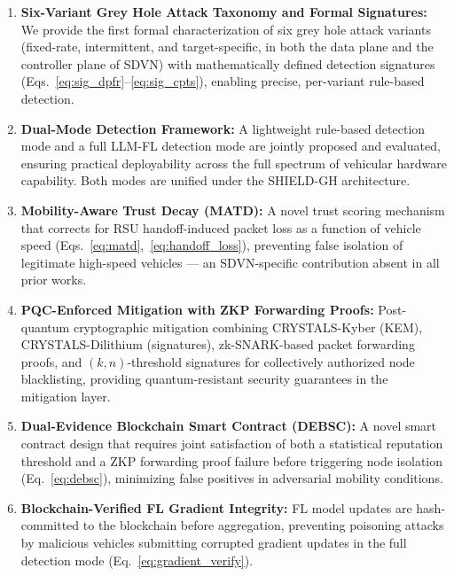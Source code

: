 \documentclass[12pt, a4paper]{report}
\begin{document}
\begin{enumerate}
  \item \textbf{Six-Variant Grey Hole Attack Taxonomy and Formal Signatures:}
  We provide the first formal characterization of six grey hole attack variants
  (fixed-rate, intermittent, and target-specific, in both the data plane and
  the controller plane of SDVN) with mathematically defined detection signatures
  (Eqs.~\eqref{eq:sig_dpfr}--\eqref{eq:sig_cpts}), enabling precise, per-variant
  rule-based detection.

  \item \textbf{Dual-Mode Detection Framework:}
  A lightweight rule-based detection mode and a full LLM-FL detection mode are
  jointly proposed and evaluated, ensuring practical deployability across the
  full spectrum of vehicular hardware capability. Both modes are unified under
  the SHIELD-GH architecture.

  \item \textbf{Mobility-Aware Trust Decay (MATD):}
  A novel trust scoring mechanism that corrects for RSU handoff-induced packet
  loss as a function of vehicle speed (Eqs.~\eqref{eq:matd},~\eqref{eq:handoff_loss}),
  preventing false isolation of legitimate high-speed vehicles — an SDVN-specific
  contribution absent in all prior works.

  \item \textbf{PQC-Enforced Mitigation with ZKP Forwarding Proofs:}
  Post-quantum cryptographic mitigation combining CRYSTALS-Kyber (KEM),
  CRYSTALS-Dilithium (signatures), zk-SNARK-based packet forwarding proofs,
  and $(k,n)$-threshold signatures for collectively authorized node blacklisting,
  providing quantum-resistant security guarantees in the mitigation layer.

  \item \textbf{Dual-Evidence Blockchain Smart Contract (DEBSC):}
  A novel smart contract design that requires joint satisfaction of both a
  statistical reputation threshold and a ZKP forwarding proof failure before
  triggering node isolation (Eq.~\eqref{eq:debsc}), minimizing false positives
  in adversarial mobility conditions.

  \item \textbf{Blockchain-Verified FL Gradient Integrity:}
  FL model updates are hash-committed to the blockchain before aggregation,
  preventing poisoning attacks by malicious vehicles submitting corrupted
  gradient updates in the full detection mode (Eq.~\eqref{eq:gradient_verify}).
\end{enumerate}
\end{document}

